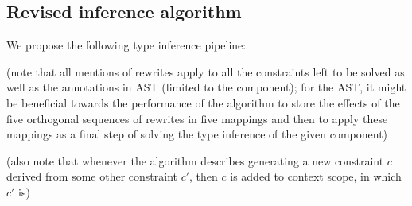 \subsection{Revised inference algorithm}

We propose the following type inference pipeline:

(note that all mentions of rewrites apply to all the constraints left to be solved as well as the annotations in AST (limited to the component); for the AST, it might be beneficial towards the performance of the algorithm to store the effects of the five orthogonal sequences of rewrites in five mappings and then to apply these mappings as a final step of solving the type inference of the given component)

(also note that whenever the algorithm describes generating a new constraint $c$ derived from some other constraint $c'$, then $c$ is added to context scope, in which $c'$ is)

